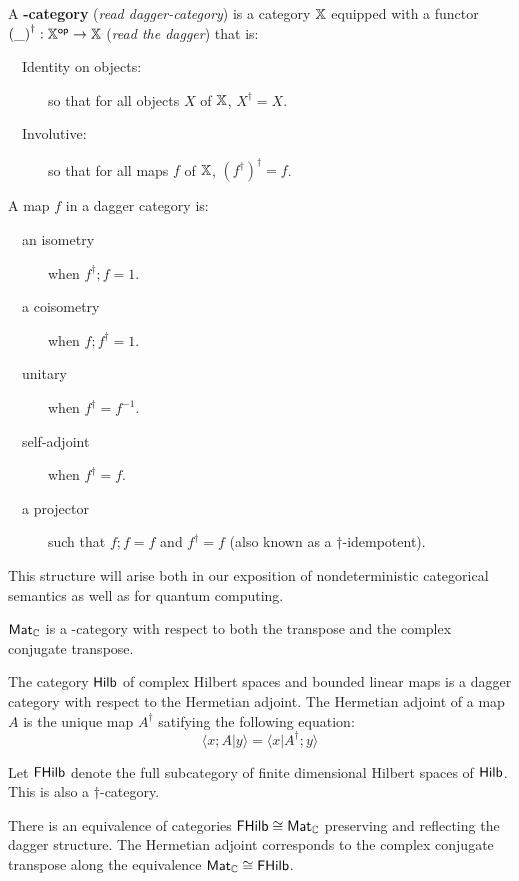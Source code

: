 \begin{definition}
A {\bf \dag-category} ({\em read dagger-category}) is a category $\mathbb{X}$ equipped with a functor ${(\_)}^\dag:\mathbb{X}^{\mathsf{op}}\to\mathbb{X}$ ({\em read the dagger}) that is:

\begin{description}
\item[\ \ Identity on objects:] so that for all objects $X$ of $\mathbb{X}$, $X^\dag = X$.
\item[\ \ Involutive:] so that for all maps $f$ of $\mathbb{X}$, $(f^\dag)^\dag = f$.
\end{description}

A map $f$ in a dagger category is:

\begin{description}
\item[\ \ an isometry] when $f^\dag; f = 1$.
\item[\ \ a coisometry] when $f; f^\dag = 1$.
\item[\ \ unitary] when $f^\dag = f^{-1}$.
\item[\ \ self-adjoint] when $f^\dag=f$.
\item[\ \ a projector] such that $f;f=f$ and $f^\dag=f$ (also known as a $\dag$-idempotent).
\end{description}

\end{definition}

This structure will arise both in our exposition of nondeterministic categorical semantics as well as for quantum computing.


\begin{example}
 $\mathsf{Mat}_{\mathbb{C}}$ is a \dag-category with respect to both the transpose and the complex conjugate transpose.
\end{example}

\begin{example}

The category $\mathsf{Hilb}$ of complex Hilbert spaces and bounded linear maps is a dagger category with respect to the Hermetian adjoint.  The Hermetian adjoint of a map $A$ is the unique map $A^\dag$ satifying the following equation:
$$
\langle x;A|y\rangle = \langle x | A^\dag; y \rangle
$$


Let $\mathsf{FHilb}$ denote the full subcategory of finite dimensional Hilbert spaces of $\mathsf{Hilb}$.  This is also a $\dag$-category.
\end{example}

\begin{lemma}
There is an equivalence of categories $\mathsf{FHilb} \cong \mathsf{Mat}_{\mathbb{C}}$ preserving and reflecting the dagger structure.
The Hermetian adjoint corresponds to the complex conjugate transpose along the equivalence $\mathsf{Mat}_{\mathbb{C}} \cong \mathsf{FHilb}$.
\end{lemma}


